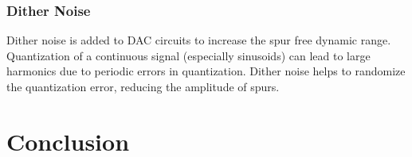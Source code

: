 \documentclass{article}
\begin{document}
	
	\subsubsection{Dither Noise}
	Dither noise is added to DAC circuits to increase the spur free dynamic range. Quantization of a continuous signal (especially sinusoids) can lead to large harmonics due to periodic errors in quantization. Dither noise helps to randomize the quantization error, reducing the amplitude of spurs.
	






\section{Conclusion}
\end{document}

